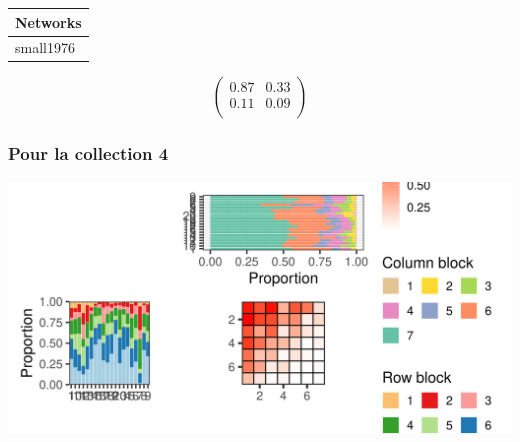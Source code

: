 \begin{tabular}{l}
\toprule
Networks\\
\midrule
small1976\\
\bottomrule
\end{tabular}

\normalsize\newline\[\begin{pmatrix} 0.87 &0.33 \\0.11 &0.09 \\ \end{pmatrix}\]

\subsubsection{Pour la collection 4 }

\includegraphics{./img/c1e07feffa95efd0355d15ccfec6dff687c1ef88.png}\newline \tiny

